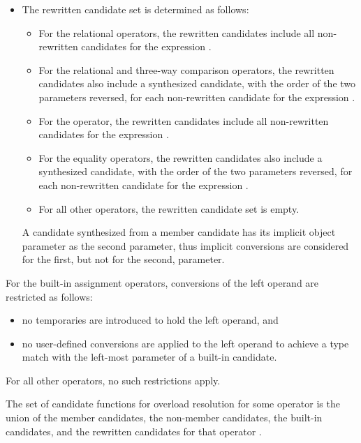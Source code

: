 \begin{itemize}
\item
The rewritten candidate set is determined as follows:
\begin{itemize}
\item
For the relational operators,
the rewritten candidates include
all non-rewritten candidates
for the expression .
\item
For the
relational and
three-way comparison
operators,
the rewritten candidates also include
a synthesized candidate,
with the order of the two parameters reversed,
for each non-rewritten candidate
for the expression
.
\item
For the \tcode{!=} operator,
the rewritten candidates
include all non-rewritten candidates
for the expression .
\item
For the equality operators,
the rewritten candidates also include a synthesized candidate,
with the order of the two parameters reversed,
for each non-rewritten candidate
for the expression .
\item
For all other operators, the rewritten candidate set is empty.
\end{itemize}
\begin{note}
A candidate synthesized from a member candidate has its implicit
object parameter as the second parameter, thus implicit conversions
are considered for the first, but not for the second, parameter.
\end{note}
\end{itemize}

\pnum
For the built-in assignment operators, conversions of the left
operand are restricted as follows:
\begin{itemize}
\item
no temporaries are introduced to hold the left operand, and
\item
no user-defined conversions are applied to the left operand to achieve
a type match with the left-most parameter of a built-in candidate.
\end{itemize}

\pnum
For all other operators, no such restrictions apply.

\pnum
The set of candidate functions for overload resolution
for some operator 
is the
union of
the member candidates,
the non-member candidates,
the built-in candidates,
and the rewritten candidates
for that operator .

